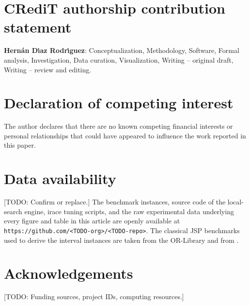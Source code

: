 \documentclass[preprint,12pt]{elsarticle}
\begin{document}
\section*{CRediT authorship contribution statement}

\textbf{Hern\'an D\'{\i}az Rodr\'{\i}guez}: Conceptualization, Methodology, Software, Formal analysis, Investigation, Data curation, Visualization, Writing -- original draft, Writing -- review and editing.


\section*{Declaration of competing interest}

The author declares that there are no known competing financial interests or personal relationships that could have appeared to influence the work reported in this paper.


\section*{Data availability}

[TODO: Confirm or replace.] The benchmark instances, source code of the local-search engine, irace tuning scripts, and the raw experimental data underlying every figure and table in this article are openly available at \texttt{https://github.com/<TODO-org>/<TODO-repo>}. The classical JSP benchmarks used to derive the interval instances are taken from the OR-Library and from \cite{TaillardBKS}.


\section*{Acknowledgements}

[TODO: Funding sources, project IDs, computing resources.]





\end{document}
